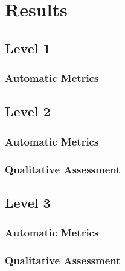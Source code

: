 \chapter{Results}
\label{chap:results}

\section{Level 1}
\label{sec:results-level1}

\subsection{Automatic Metrics}
\label{subsec:results-level1-automatic}

\section{Level 2}
\label{sec:results-level2}

\subsection{Automatic Metrics}
\label{subsec:results-level2-automatic}

\subsection{Qualitative Assessment}
\label{subsec:results-level2-qualitative}

\section{Level 3}
\label{sec:results-level3}

\subsection{Automatic Metrics}
\label{subsec:results-level3-automatic}

\subsection{Qualitative Assessment}
\label{subsec:results-level3-qualitative}
